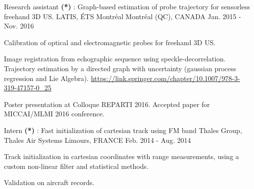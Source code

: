 \begin{cventries}

\cventry
{Research assistant \textbf{(*)} : Graph-based estimation of probe trajectory for sensorless freehand 3D US.}%
{LATIS, ÉTS Montréal} %
{\hspace{-5mm}Montréal (QC), CANADA} %
{Jan. 2015 - Nov. 2016} %
{ %
\begin{cvitems}
\item {Calibration of optical and electromagnetic probes for freehand 3D US.}
\item {Image registration from echographic sequence using speckle-decorrelation. Trajectory estimation by a directed graph with uncertainty (gaussian process regression and Lie Algebra). \url{https://link.springer.com/chapter/10.1007/978-3-319-47157-0_25}}
\item {Poster presentation at Colloque REPARTI 2016. Accepted paper for MICCAI/MLMI 2016 conference.}
\end{cvitems}
}


\cventry
{Intern \textbf{(*)} : Fast initialization of cartesian track using FM band} %
{Thales Group, Thales Air Systems} %
{Limours, FRANCE} %
{Feb. 2014 - Aug. 2014} %
{ %
\begin{cvitems}
\item {Track initialization in cartesian coordinates with range measurements, using a custom non-linear filter and statistical methods.}
\item {Validation on aircraft records.}
\end{cvitems}
}
\end{cventries}
